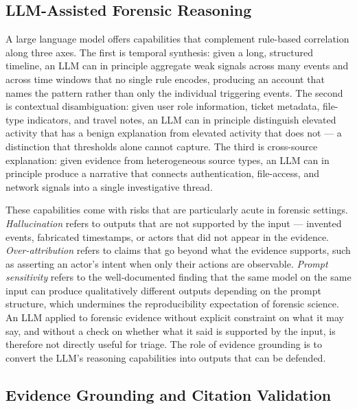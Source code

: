\documentclass[conference]{IEEEtran}
\begin{document}
\subsection{LLM-Assisted Forensic Reasoning}
\label{sec:bg-llm}

A large language model offers capabilities that complement rule-based correlation along three axes. The first is temporal synthesis: given a long, structured timeline, an LLM can in principle aggregate weak signals across many events and across time windows that no single rule encodes, producing an account that names the pattern rather than only the individual triggering events. The second is contextual disambiguation: given user role information, ticket metadata, file-type indicators, and travel notes, an LLM can in principle distinguish elevated activity that has a benign explanation from elevated activity that does not --- a distinction that thresholds alone cannot capture. The third is cross-source explanation: given evidence from heterogeneous source types, an LLM can in principle produce a narrative that connects authentication, file-access, and network signals into a single investigative thread.

These capabilities come with risks that are particularly acute in forensic settings. \emph{Hallucination} refers to outputs that are not supported by the input --- invented events, fabricated timestamps, or actors that did not appear in the evidence. \emph{Over-attribution} refers to claims that go beyond what the evidence supports, such as asserting an actor's intent when only their actions are observable. \emph{Prompt sensitivity} refers to the well-documented finding that the same model on the same input can produce qualitatively different outputs depending on the prompt structure, which undermines the reproducibility expectation of forensic science. An LLM applied to forensic evidence without explicit constraint on what it may say, and without a check on whether what it said is supported by the input, is therefore not directly useful for triage. The role of evidence grounding is to convert the LLM's reasoning capabilities into outputs that can be defended.

\subsection{Evidence Grounding and Citation Validation}
\label{sec:bg-grounding}
\end{document}
